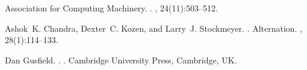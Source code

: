 \documentclass[11pt]{article}
\begin{document}
\begin{thebibliography}{}
{Association for Computing Machinery}.
.
, 24(11):503--512.

Ashok~K. Chandra, Dexter~C. Kozen, and Larry~J. Stockmeyer.
.
\newblock Alternation.
,
  28(1):114--133.

Dan Gusfield.
.
.
\newblock Cambridge University Press, Cambridge, UK.

\end{thebibliography}
\end{document}

